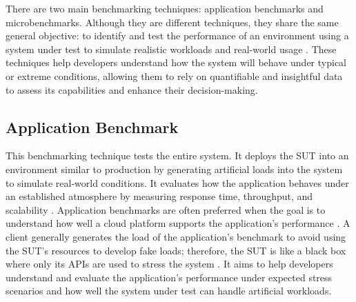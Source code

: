 There are two main benchmarking techniques: application benchmarks and microbenchmarks. Although they are different techniques, they share the same general objective: to identify and test the performance of an environment using a system under test to simulate realistic workloads and real-world usage \cite{japke2023earlymicrobenchmarkcatches, grambow2021usingApplication, grambow2020benchmarkingMicroservicesperformance}. These techniques help developers understand how the system will behave under typical or extreme conditions, allowing them to rely on quantifiable and insightful data to assess its capabilities and enhance their decision-making. 

\subsection{Application Benchmark}
\label{sec:application_benchmarks}
This benchmarking technique tests the entire system. It deploys the \ac{SUT} into an environment similar to production by generating artificial loads into the system to simulate real-world conditions. It evaluates how the application behaves under an established atmosphere by measuring response time, throughput, and scalability \cite{denaro2004early}. Application benchmarks are often preferred when the goal is to understand how well a cloud platform supports the application's performance \cite{grambow2021usingApplication}. A client generally generates the load of the application's benchmark to avoid using the \ac{SUT}'s resources to develop fake loads; therefore, the \ac{SUT} is like a black box where only its \ac{API}s are used to stress the system \cite{japke2023earlymicrobenchmarkcatches}. It aims to help developers understand and evaluate the application's performance under expected stress scenarios and how well the system under test can handle artificial workloads. \\
